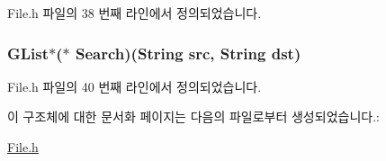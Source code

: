 File.\-h 파일의 38 번째 라인에서 정의되었습니다.

\hypertarget{struct___file_a4372eaf72ad5ad415c0dc75a3420e1bb}{
\subsubsection[{Search}]{\setlength{\rightskip}{0pt plus 5cm}G\-List$\ast$($\ast$  Search)({\bf String} src, {\bf String} dst)}}\label{struct___file_a4372eaf72ad5ad415c0dc75a3420e1bb}


File.\-h 파일의 40 번째 라인에서 정의되었습니다.



이 구조체에 대한 문서화 페이지는 다음의 파일로부터 생성되었습니다.\-:\begin{DoxyCompactItemize}
\item 
\hyperlink{_file_8h}{File.\-h}\end{DoxyCompactItemize}
